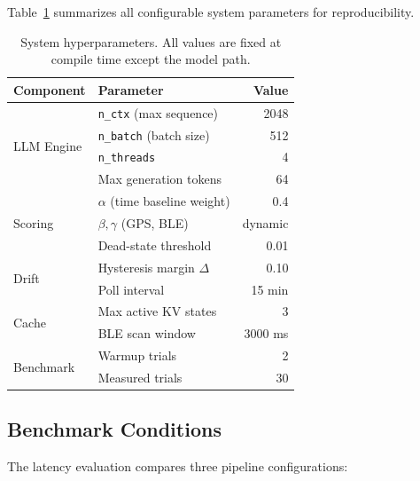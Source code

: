 \documentclass[journal]{IEEEtran}
\begin{document}
Table~\ref{tab:hyperparams} summarizes all configurable system parameters for reproducibility.

\begin{table}[htbp]
\centering
\caption{System hyperparameters. All values are fixed at compile time except the model path.}
\label{tab:hyperparams}
\begin{tabular}{llr}
\hline
\textbf{Component} & \textbf{Parameter} & \textbf{Value} \\
\hline
\multirow{4}{*}{LLM Engine} & \texttt{n\_ctx} (max sequence) & 2048 \\
 & \texttt{n\_batch} (batch size) & 512 \\
 & \texttt{n\_threads} & 4 \\
 & Max generation tokens & 64 \\
\hline
\multirow{3}{*}{Scoring} & $\alpha$ (time baseline weight) & 0.4 \\
 & $\beta, \gamma$ (GPS, BLE) & dynamic \\
 & Dead-state threshold & 0.01 \\
\hline
\multirow{2}{*}{Drift} & Hysteresis margin $\Delta$ & 0.10 \\
 & Poll interval & 15 min \\
\hline
\multirow{2}{*}{Cache} & Max active KV states & 3 \\
 & BLE scan window & 3000 ms \\
\hline
\multirow{2}{*}{Benchmark} & Warmup trials & 2 \\
 & Measured trials & 30 \\
\hline
\end{tabular}
\end{table}

\subsection{Benchmark Conditions}
\label{sec:conditions}

The latency evaluation compares three pipeline configurations:
\end{document}
